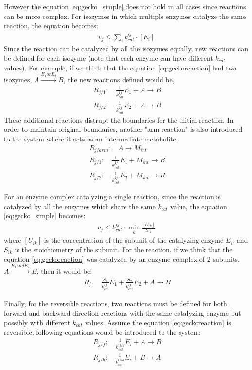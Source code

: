 However the equation \ref{eq:gecko_simple} does not hold in all cases since reactions can be more complex. For isozymes in which multiple enzymes catalyze the same reaction, the equation becomes:
\begin{align}
 \label{eq:gecko_isozymes}
 \ v_{j} \leq \sum\limits_{i} k_{cat}^{ij} \cdot [E_{i}]
 \
\end{align}
Since the reaction can be catalyzed by all the isozymes equally, new reactions can be defined for each isozyme (note that each enzyme can have different $k_{cat}$ values). For example, if we think that the equation \ref{eq:geckoreaction} had two isozymes, $A \xrightarrow{E_1 or E_2} B$, the new reactions defined would be,
\begin{align}
 \ R_{j/1}: \quad \frac{1}{k_{cat}^{1j}}E_1 + A \to B \\
 \ R_{j/2}: \quad \frac{1}{k_{cat}^{2j}}E_2 + A \to B
\end{align}
These additional reactions distrupt the boundaries for the initial reaction. In order to maintain original boundaries, another "arm-reaction" is also introduced to the system where it acts as an intermediate metabolite.
\begin{align}
 \ R_{j/arm}: \quad A \to M_{int} \\
 \ R_{j/1}: \quad \frac{1}{k_{cat}^{1j}}E_1 + M_{int} \to B \\
 \ R_{j/2}: \quad \frac{1}{k_{cat}^{2j}}E_2 + M_{int} \to B
\end{align}

For an enzyme complex catalyzing a single reaction, since the reaction is catalyzed by all the enzymes which share the same $k_{cat}$ value, the equation \ref{eq:gecko_simple} becomes:
\begin{align}
 \label{eq:gecko_complex}
 \ v_{j} \leq  k_{cat}^{ij} \cdot \min\limits_{k} \frac{ [U_{ik}] }{ S_{ik} }
 \
\end{align}
\noindent where $[U_{ik}]$  is the concentration of the subunit of the catalyzing enzyme $E_{i}$, and $S_{ik}$ is the stoichiometry of the subunit. For the reaction, if we think that the equation \ref{eq:geckoreaction} was catalyzed by an enzyme complex of 2 subunits, $A \xrightarrow{E_1 and E_2} B$, then it would be:
\begin{align}
 \label{eq:gecko_complex2}
 \ R_{j}: \quad \frac{S_1}{k_{cat}^{ij}}E_1 +\frac{S_2}{k_{cat}^{ij}}E_2 + A \to B
\end{align}

Finally, for the reversible reactions, two reactions must be defined for both forward and backward direction reactions with the same catalyzing enzyme but possibly with different $k_{cat}$ values. Assume the equation \ref{eq:geckoreaction} is reversible, following equations would be introduced to the system:
\begin{align}
 \label{eq:gecko_reversible}
 \ R_{j/f}: \quad \frac{1}{k_{cat}^{ij/f}}E_i + A \to B \\
 \ R_{j/b}: \quad \frac{1}{k_{cat}^{ij/b}}E_i + B \to A
\end{align}

